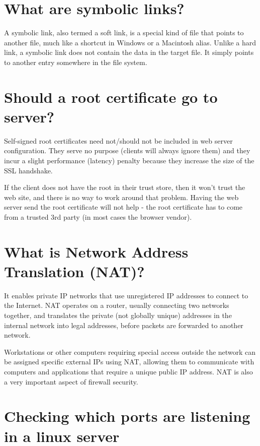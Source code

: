 \section{What are symbolic links?}

A symbolic link, also termed a soft link, is a special kind of file that points to another file, much like a shortcut in Windows or a Macintosh alias. Unlike a hard link, a symbolic link does not contain the data in the target file. It simply points to another entry somewhere in the file system.

\section{Should a root certificate go to server?}

Self-signed root certificates need not/should not be included in web server configuration. They serve no purpose (clients will always ignore them) and they incur a slight performance (latency) penalty because they increase the size of the SSL handshake.

If the client does not have the root in their trust store, then it won't trust the web site, and there is no way to work around that problem. Having the web server send the root certificate will not help - the root certificate has to come from a trusted 3rd party (in most cases the browser vendor).

\section{What is Network Address Translation (NAT)?}

It enables private IP networks that use unregistered IP addresses to connect to the Internet. NAT operates on a router, usually connecting two networks together, and translates the private (not globally unique) addresses in the internal network into legal addresses, before packets are forwarded to another network.

Workstations or other computers requiring special access outside the network can be assigned specific external IPs using NAT, allowing them to communicate with computers and applications that require a unique public IP address. NAT is also a very important aspect of firewall security.

\section{Checking which ports are listening in a linux server}

